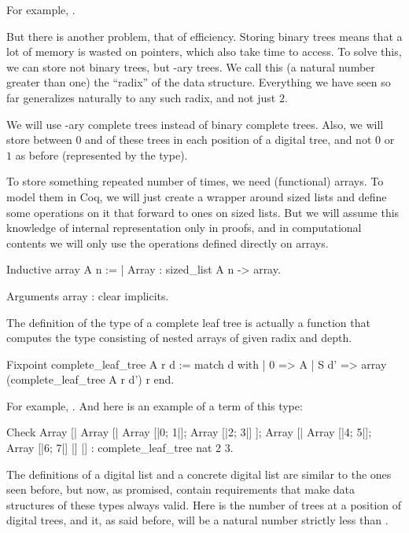 \documentclass{article}
\begin{document}
For example, .

But there is another problem, that of efficiency. Storing binary trees means that a lot of memory is wasted on pointers, which also take time to access. To solve this, we can store not binary trees, but -ary trees. We call this  (a natural number greater than one) the ``radix'' of the data structure. Everything we have seen so far generalizes naturally to any such radix, and not just $2$.

We will use -ary complete trees instead of binary complete trees. Also, we will store between $0$ and  of these trees in each position of a digital tree, and not $0$ or $1$ as before (represented by the  type).

To store something repeated number of times, we need (functional) arrays. To model them in Coq, we will just create a wrapper around sized lists and define some operations on it that forward to ones on sized lists. But we will assume this knowledge of internal representation only in proofs, and in computational contents we will only use the operations defined directly on arrays.

\begin{coq}
Inductive array {A n} :=
  | Array : sized_list A n -> array.

Arguments array : clear implicits.
\end{coq}

The definition of the type of a complete leaf tree is actually a function that computes the type consisting of nested arrays of given radix and depth.

\begin{coq}
Fixpoint complete_leaf_tree A r d :=
  match d with
  | 0 => A
  | S d' => array (complete_leaf_tree A r d') r
  end.
\end{coq}

For example, . And here is an example of a term of this type:

\begin{coq}
Check
    Array [|
        Array [|
            Array [|0; 1|];
            Array [|2; 3|]
        ];
        Array [|
            Array [|4; 5|];
            Array [|6; 7|]
        |]
    |]
    : complete_leaf_tree nat 2 3.
\end{coq}

The definitions of a digital list and a concrete digital list are similar to the ones seen before, but now, as promised, contain requirements that make data structures of these types always valid. Here  is the number of trees at a position of digital trees, and it, as said before, will be a natural number strictly less than .
\end{document}
